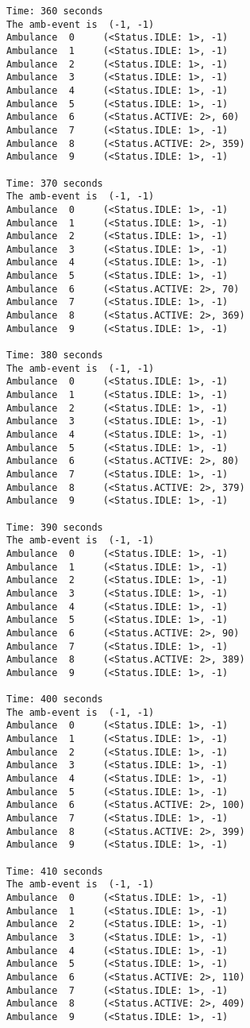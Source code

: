 \documentclass[11pt]{article}
\begin{document}
\begin{Verbatim}[commandchars=\\\{\}]
Time: 360 seconds
The amb-event is  (-1, -1)
Ambulance  0	 (<Status.IDLE: 1>, -1)
Ambulance  1	 (<Status.IDLE: 1>, -1)
Ambulance  2	 (<Status.IDLE: 1>, -1)
Ambulance  3	 (<Status.IDLE: 1>, -1)
Ambulance  4	 (<Status.IDLE: 1>, -1)
Ambulance  5	 (<Status.IDLE: 1>, -1)
Ambulance  6	 (<Status.ACTIVE: 2>, 60)
Ambulance  7	 (<Status.IDLE: 1>, -1)
Ambulance  8	 (<Status.ACTIVE: 2>, 359)
Ambulance  9	 (<Status.IDLE: 1>, -1)

Time: 370 seconds
The amb-event is  (-1, -1)
Ambulance  0	 (<Status.IDLE: 1>, -1)
Ambulance  1	 (<Status.IDLE: 1>, -1)
Ambulance  2	 (<Status.IDLE: 1>, -1)
Ambulance  3	 (<Status.IDLE: 1>, -1)
Ambulance  4	 (<Status.IDLE: 1>, -1)
Ambulance  5	 (<Status.IDLE: 1>, -1)
Ambulance  6	 (<Status.ACTIVE: 2>, 70)
Ambulance  7	 (<Status.IDLE: 1>, -1)
Ambulance  8	 (<Status.ACTIVE: 2>, 369)
Ambulance  9	 (<Status.IDLE: 1>, -1)

Time: 380 seconds
The amb-event is  (-1, -1)
Ambulance  0	 (<Status.IDLE: 1>, -1)
Ambulance  1	 (<Status.IDLE: 1>, -1)
Ambulance  2	 (<Status.IDLE: 1>, -1)
Ambulance  3	 (<Status.IDLE: 1>, -1)
Ambulance  4	 (<Status.IDLE: 1>, -1)
Ambulance  5	 (<Status.IDLE: 1>, -1)
Ambulance  6	 (<Status.ACTIVE: 2>, 80)
Ambulance  7	 (<Status.IDLE: 1>, -1)
Ambulance  8	 (<Status.ACTIVE: 2>, 379)
Ambulance  9	 (<Status.IDLE: 1>, -1)

Time: 390 seconds
The amb-event is  (-1, -1)
Ambulance  0	 (<Status.IDLE: 1>, -1)
Ambulance  1	 (<Status.IDLE: 1>, -1)
Ambulance  2	 (<Status.IDLE: 1>, -1)
Ambulance  3	 (<Status.IDLE: 1>, -1)
Ambulance  4	 (<Status.IDLE: 1>, -1)
Ambulance  5	 (<Status.IDLE: 1>, -1)
Ambulance  6	 (<Status.ACTIVE: 2>, 90)
Ambulance  7	 (<Status.IDLE: 1>, -1)
Ambulance  8	 (<Status.ACTIVE: 2>, 389)
Ambulance  9	 (<Status.IDLE: 1>, -1)

Time: 400 seconds
The amb-event is  (-1, -1)
Ambulance  0	 (<Status.IDLE: 1>, -1)
Ambulance  1	 (<Status.IDLE: 1>, -1)
Ambulance  2	 (<Status.IDLE: 1>, -1)
Ambulance  3	 (<Status.IDLE: 1>, -1)
Ambulance  4	 (<Status.IDLE: 1>, -1)
Ambulance  5	 (<Status.IDLE: 1>, -1)
Ambulance  6	 (<Status.ACTIVE: 2>, 100)
Ambulance  7	 (<Status.IDLE: 1>, -1)
Ambulance  8	 (<Status.ACTIVE: 2>, 399)
Ambulance  9	 (<Status.IDLE: 1>, -1)

Time: 410 seconds
The amb-event is  (-1, -1)
Ambulance  0	 (<Status.IDLE: 1>, -1)
Ambulance  1	 (<Status.IDLE: 1>, -1)
Ambulance  2	 (<Status.IDLE: 1>, -1)
Ambulance  3	 (<Status.IDLE: 1>, -1)
Ambulance  4	 (<Status.IDLE: 1>, -1)
Ambulance  5	 (<Status.IDLE: 1>, -1)
Ambulance  6	 (<Status.ACTIVE: 2>, 110)
Ambulance  7	 (<Status.IDLE: 1>, -1)
Ambulance  8	 (<Status.ACTIVE: 2>, 409)
Ambulance  9	 (<Status.IDLE: 1>, -1)


\end{Verbatim}
\end{document}
